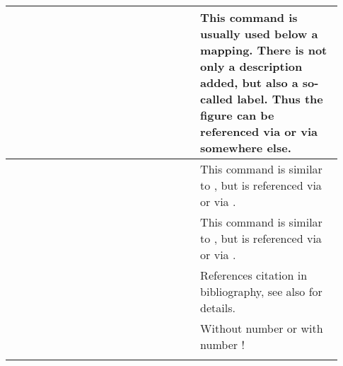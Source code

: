\begin{footnotesize}
\begin{longtable}{ | P{0.53\linewidth} | p{0.4\linewidth} | }
        \hline
                                             &
        This command is usually used below a mapping. There is not only a
        description added, but also a so-called label. Thus the figure can be
        referenced via
        or via
        somewhere else.                                                                                      \\
        \hline
                                           &
        This command is similar to
        ,
        but is referenced via
         or via
        .                                              \\
        \hline
                                               &
        This command is similar to
        , but is
        referenced via
         or via
        .                                                \\
        \hline
                                                          &
        References citation in bibliography, see also  for details.  \\
        \hline
                                                           &
        Without number \tsDegree{} or with number !                                            \\
        \hline
                                                             &

\end{longtable}
\end{footnotesize}
